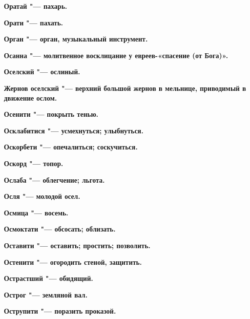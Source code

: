 \begin{mymulticols}{2}
\bfseries Оратай\normalfont{} "--- пахарь. 




\bfseries Орати\normalfont{} "--- пахать. 




\bfseries Орган\normalfont{} "--- орган, музыкальный инструмент. 




\bfseries Осанна\normalfont{} "--- молитвенное восклицание у евреев-«спасение (от Бога)». 




\bfseries Оселский\normalfont{} "--- ослиный. 




\bfseries Жернов оселский\normalfont{} "--- верхний большой жернов в мельнице, приводимый в движение ослом. 




\bfseries Осенити\normalfont{} "--- покрыть тенью. 




\bfseries Осклабитися\normalfont{} "--- усмехнуться; улыбнуться. 




\bfseries Оскорбети\normalfont{} "--- опечалиться; соскучиться. 




\bfseries Оскорд\normalfont{} "--- топор. 




\bfseries Ослаба\normalfont{} "--- облегчение; льгота. 




\bfseries Осля\normalfont{} "--- молодой осел. 




\bfseries Осмица\normalfont{} "--- восемь. 




\bfseries Осмоктати\normalfont{} "--- обсосать; облизать. 




\bfseries Оставити\normalfont{} "--- оставить; простить; позволить. 




\bfseries Остенити\normalfont{} "--- огородить стеной, защитить. 




\bfseries Острастший\normalfont{} "--- обидящий. 




\bfseries Острог\normalfont{} "--- земляной вал. 




\bfseries Острупити\normalfont{} "--- поразить проказой. 





\end{mymulticols}

